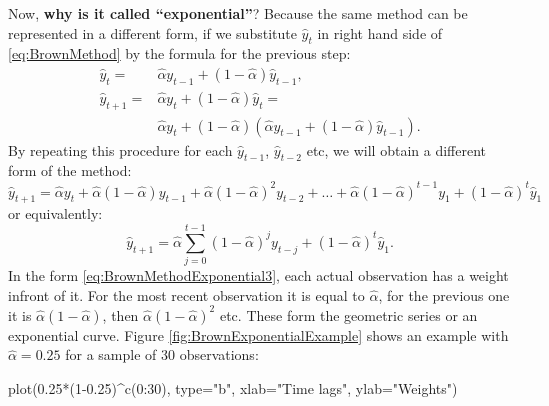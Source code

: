 \documentclass[
]{book}
\newenvironment{Shaded}{\begin{snugshade}}{\end{snugshade}}
\newcommand{\AttributeTok}[1]{\textcolor[rgb]{0.77,0.63,0.00}{#1}}
\newcommand{\DecValTok}[1]{\textcolor[rgb]{0.00,0.00,0.81}{#1}}
\newcommand{\FloatTok}[1]{\textcolor[rgb]{0.00,0.00,0.81}{#1}}
\newcommand{\FunctionTok}[1]{\textcolor[rgb]{0.00,0.00,0.00}{#1}}
\newcommand{\NormalTok}[1]{#1}
\newcommand{\SpecialCharTok}[1]{\textcolor[rgb]{0.00,0.00,0.00}{#1}}
\newcommand{\StringTok}[1]{\textcolor[rgb]{0.31,0.60,0.02}{#1}}
\theoremstyle{definition}
\theoremstyle{definition}
\theoremstyle{definition}
\theoremstyle{definition}
\theoremstyle{remark}
\begin{document}
Now, \textbf{why is it called ``exponential''}? Because the same method can be represented in a different form, if we substitute \(\hat{y}_{t}\) in right hand side of \eqref{eq:BrownMethod} by the formula for the previous step:
\begin{equation}
  \begin{aligned}
  \hat{y}_{t} = &\hat{\alpha} {y}_{t-1} + (1 - \hat{\alpha}) \hat{y}_{t-1}, \\
  \hat{y}_{t+1} = &\hat{\alpha} {y}_{t} + (1 - \hat{\alpha}) \hat{y}_{t} = \\
  & \hat{\alpha} {y}_{t} + (1 -\hat{\alpha}) \left( \hat{\alpha} {y}_{t-1} + (1 -\hat{\alpha}) \hat{y}_{t-1} \right).
  \end{aligned}
  \label{eq:BrownMethodExponential1}
\end{equation}
By repeating this procedure for each \(\hat{y}_{t-1}\), \(\hat{y}_{t-2}\) etc, we will obtain a different form of the method:
\begin{equation}
  \hat{y}_{t+1} = \hat{\alpha} {y}_{t} + \hat{\alpha} (1 -\hat{\alpha}) {y}_{t-1} + \hat{\alpha} (1 -\hat{\alpha})^2 {y}_{t-2} + \dots  + \hat{\alpha} (1 -\hat{\alpha})^{t-1} {y}_{1} + (1 -\hat{\alpha})^t \hat{y}_1 
  \label{eq:BrownMethodExponential2}
\end{equation}
or equivalently:
\begin{equation}
  \hat{y}_{t+1} = \hat{\alpha} \sum_{j=0}^{t-1} (1 -\hat{\alpha})^j {y}_{t-j} + (1 -\hat{\alpha})^t \hat{y}_1 .
  \label{eq:BrownMethodExponential3}
\end{equation}
In the form \eqref{eq:BrownMethodExponential3}, each actual observation has a weight infront of it. For the most recent observation it is equal to \(\hat{\alpha}\), for the previous one it is \(\hat{\alpha} (1 -\hat{\alpha})\), then \(\hat{\alpha} (1 -\hat{\alpha})^2\) etc. These form the geometric series or an exponential curve. Figure \ref{fig:BrownExponentialExample} shows an example with \(\hat{\alpha} =0.25\) for a sample of 30 observations:

\begin{Shaded}
\begin{Highlighting}[]
\FunctionTok{plot}\NormalTok{(}\FloatTok{0.25}\SpecialCharTok{*}\NormalTok{(}\DecValTok{1}\FloatTok{{-}0.25}\NormalTok{)}\SpecialCharTok{\^{}}\FunctionTok{c}\NormalTok{(}\DecValTok{0}\SpecialCharTok{:}\DecValTok{30}\NormalTok{), }\AttributeTok{type=}\StringTok{"b"}\NormalTok{, }
     \AttributeTok{xlab=}\StringTok{"Time lags"}\NormalTok{, }\AttributeTok{ylab=}\StringTok{"Weights"}\NormalTok{)}
\end{Highlighting}
\end{Shaded}
\end{document}
